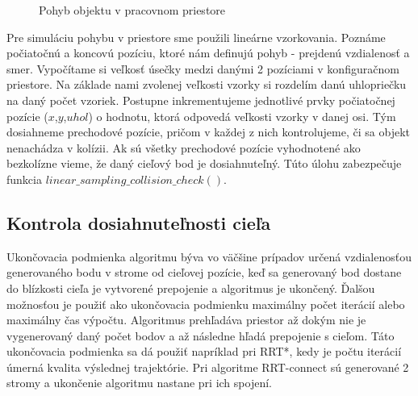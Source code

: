 \begin{figure}[h!]
	\centering
	\caption{Pohyb objektu v pracovnom priestore} \label{OBRAZOK 4.5} 
\end{figure} 


Pre simuláciu pohybu v priestore sme použili lineárne vzorkovania. Poznáme počiatočnú a koncovú pozíciu, ktoré nám definujú pohyb - prejdenú vzdialenosť a smer. Vypočítame si veľkosť úsečky medzi danými 2 pozíciami v konfiguračnom priestore. Na základe nami zvolenej veľkosti vzorky si rozdelím danú uhlopriečku na daný počet vzoriek. Postupne inkrementujeme jednotlivé prvky počiatočnej pozície ($ x $,$ y $,$ uhol $) o hodnotu, ktorá odpovedá veľkosti vzorky v danej osi. Tým dosiahneme prechodové pozície, pričom v každej z nich kontrolujeme, či sa objekt nenachádza v kolízii.  Ak sú všetky prechodové pozície vyhodnotené ako bezkolízne vieme, že daný cieľový bod je dosiahnuteľný.
Túto úlohu zabezpečuje funkcia $ linear\_sampling\_collision\_check()$.



\subsection{Kontrola dosiahnuteľnosti cieľa}

Ukončovacia podmienka algoritmu býva vo väčšine prípadov určená vzdialenosťou generovaného bodu v strome od cieľovej pozície, keď sa generovaný bod dostane do blízkosti cieľa je vytvorené prepojenie a algoritmus je ukončený. Ďalšou možnosťou je použiť ako ukončovacia podmienku maximálny počet iterácií alebo maximálny čas výpočtu. Algoritmus prehľadáva priestor až dokým nie je vygenerovaný daný počet bodov a až následne hľadá prepojenie s cieľom. Táto ukončovacia podmienka sa dá použiť napríklad pri RRT*, kedy je počtu iterácií úmerná kvalita výslednej trajektórie. Pri algoritme RRT-connect sú generované 2 stromy a ukončenie algoritmu
nastane pri ich spojení.

